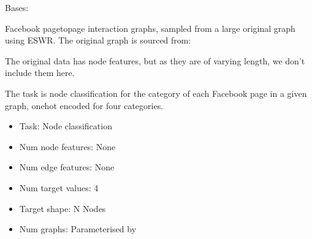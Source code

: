 \documentclass[letterpaper,10pt,english]{sphinxhowto}
\begin{document}
\begin{fulllineitems}
\label{\detokenize{datasets:datasets.FacebookDataset}}
\pysigstartsignatures
{}
\pysigstopsignatures
\sphinxAtStartPar
Bases: 

\sphinxAtStartPar
Facebook page\sphinxhyphen{}to\sphinxhyphen{}page interaction graphs, sampled from a large original graph using ESWR.
The original graph is sourced from:
\begin{quote}

\sphinxAtStartPar
{}
\end{quote}

\sphinxAtStartPar
The original data has node features, but as they are of varying length, we don’t include them here.

\sphinxAtStartPar
The task is node classification for the category of each Facebook page in a given graph, one\sphinxhyphen{}hot encoded for four categories.
\begin{itemize}
\item {} 
\sphinxAtStartPar
Task: Node classification

\item {} 
\sphinxAtStartPar
Num node features: None

\item {} 
\sphinxAtStartPar
Num edge features: None

\item {} 
\sphinxAtStartPar
Num target values: 4

\item {} 
\sphinxAtStartPar
Target shape: N Nodes

\item {} 
\sphinxAtStartPar
Num graphs: Parameterised by 


\end{itemize}
\end{fulllineitems}
\end{document}
